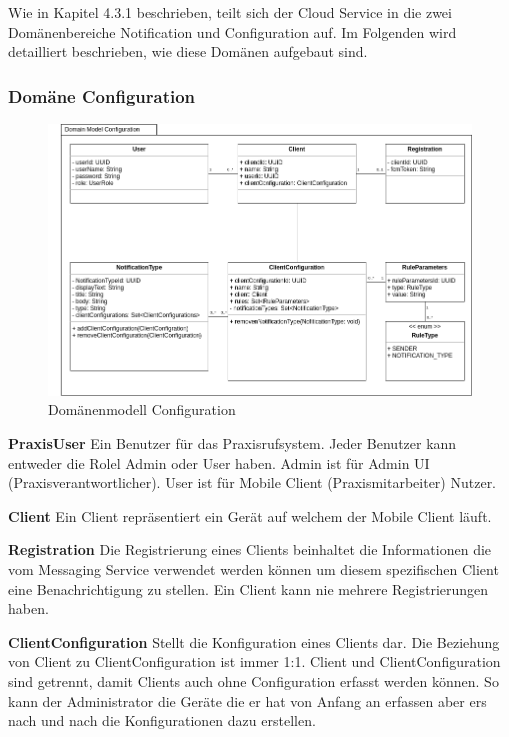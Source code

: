 Wie in Kapitel 4.3.1 beschrieben, teilt sich der Cloud Service in die zwei Domänenbereiche Notification und Configuration auf.
Im Folgenden wird detailliert beschrieben, wie diese Domänen aufgebaut sind.

\subsubsection*{Domäne Configuration}

\begin{figure}[h]
    \centering
    \begin{minipage}[b]{0.9\textwidth}
        \includegraphics[width=\textwidth]{graphics/Class_Configuration_Domain}
        \caption{Domänenmodell Configuration}
    \end{minipage}
\end{figure}

\textbf{PraxisUser}
Ein Benutzer für das Praxisrufsystem.
Jeder Benutzer kann entweder die Rolel Admin oder User haben.
Admin ist für Admin UI (Praxisverantwortlicher).
User ist für Mobile Client (Praxismitarbeiter) Nutzer.

\textbf{Client}
Ein Client repräsentiert ein Gerät auf welchem der Mobile Client läuft.

\textbf{Registration}
Die Registrierung eines Clients beinhaltet die Informationen die vom Messaging Service verwendet werden können um diesem spezifischen Client eine Benachrichtigung zu stellen.
Ein Client kann nie mehrere Registrierungen haben.

\textbf{ClientConfiguration}
Stellt die Konfiguration eines Clients dar.
Die Beziehung von Client zu ClientConfiguration ist immer 1:1.
Client und ClientConfiguration sind getrennt, damit Clients auch ohne Configuration erfasst werden können.
So kann der Administrator die Geräte die er hat von Anfang an erfassen aber ers nach und nach die Konfigurationen dazu erstellen.

